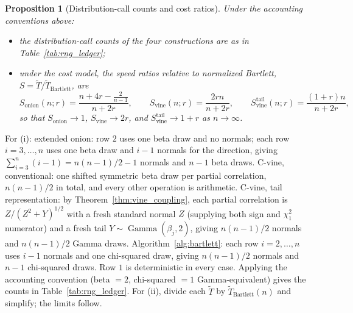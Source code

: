 \documentclass[12pt,english]{article}
\makeatletter
\theoremstyle{plain} %
\newtheorem{proposition}{Proposition}
\theoremstyle{definition} %
\theoremstyle{remark} %
\renewenvironment{proof}[1][\proofname]{\par
  \pushQED{\qed}%
  \normalfont \topsep6\p@\@plus6\p@\relax
  \trivlist
  \item[\hskip\labelsep\bfseries#1:]\ignorespaces
}{%
  \popQED\endtrivlist\@endpefalse
}
\makeatother
\begin{document}
\begin{proposition}[Distribution-call counts and cost ratios]
\label{prop:rng_ledger}
Under the accounting conventions above:
\begin{itemize}
\item[(i)] the distribution-call counts of the four constructions are as in Table~\ref{tab:rng_ledger};
\item[(ii)] under the cost model, the speed ratios relative to normalized Bartlett, $S=\widetilde{T}/\widetilde{T}_{\operatorname{Bartlett}}$, are
$$
S_{\operatorname{onion}}(n;r)=\frac{n+4r-\frac{2}{n-1}}{n+2r},
\qquad
S_{\operatorname{vine}}(n;r)=\frac{2rn}{n+2r},
\qquad
S_{\operatorname{vine}}^{\operatorname{tail}}(n;r)=\frac{(1+r)n}{n+2r},
$$
so that $S_{\operatorname{onion}}\to1$, $S_{\operatorname{vine}}\to2r$, and $S_{\operatorname{vine}}^{\operatorname{tail}}\to1+r$ as $n\to\infty$.
\end{itemize}
\end{proposition}

\begin{proof}
For (i): extended onion: row $2$ uses one beta draw and no normals; each row $i=3,\ldots,n$ uses one beta draw and $i-1$ normals for the direction, giving $\sum_{i=3}^n(i-1)=n(n-1)/2-1$ normals and $n-1$ beta draws. C-vine, conventional: one shifted symmetric beta draw per partial correlation, $n(n-1)/2$ in total, and every other operation is arithmetic. C-vine, tail representation: by Theorem~\ref{thm:vine_coupling}, each partial correlation is $Z/(Z^2+Y)^{1/2}$ with a fresh standard normal $Z$ (supplying both sign and $\chi^2_1$ numerator) and a fresh tail $Y\sim\operatorname{Gamma}(\beta_j,2)$, giving $n(n-1)/2$ normals and $n(n-1)/2$ Gamma draws. Algorithm~\ref{alg:bartlett}: each row $i=2,\ldots,n$ uses $i-1$ normals and one chi-squared draw, giving $n(n-1)/2$ normals and $n-1$ chi-squared draws. Row $1$ is deterministic in every case. Applying the accounting convention (beta $=2$, chi-squared $=1$ Gamma-equivalent) gives the counts in Table~\ref{tab:rng_ledger}. For (ii), divide each $\widetilde{T}$ by $\widetilde{T}_{\operatorname{Bartlett}}(n)$ and simplify; the limits follow.
\end{proof}
\end{document}
